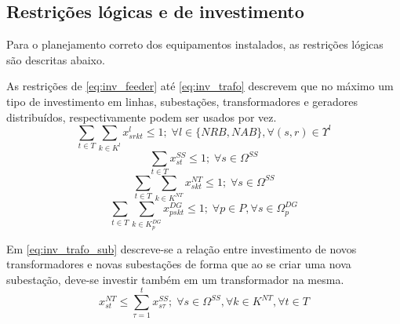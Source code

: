 \subsection{Restrições lógicas e de investimento}

Para o planejamento correto dos equipamentos instalados, as restrições lógicas são descritas abaixo.

As restrições de \eqref{eq:inv_feeder} até \eqref{eq:inv_trafo} descrevem que no máximo um tipo de investimento em linhas, subestações, transformadores e geradores distribuídos, respectivamente podem ser usados por vez.
\begin{equation}
    \sum_{t \in T} \sum_{k \in K^l} x^l_{srkt} \leq 1; \; \forall l \in \{NRB, NAB\}, \forall (s,r) \in \Upsilon^l
    \label{eq:inv_feeder}
\end{equation}
\begin{equation}
    \sum_{t \in T} x^{SS}_{st} \leq 1; \; \forall s \in \Omega^{SS}
    \label{eq:inv_sub}
\end{equation}
\begin{equation}
    \sum_{t \in T} \sum_{k \in K^{NT}} x^{NT}_{skt} \leq 1; \; \forall s \in \Omega^{SS}
    \label{eq:inv_trafo}
\end{equation}
\begin{equation}
    \sum_{t \in T} \sum_{k \in K^{DG}_p} x^{DG}_{pskt} \leq 1; \; \forall p \in P, \forall s \in \Omega^{DG}_p
    \label{eq:inv_DG}
\end{equation}

Em \eqref{eq:inv_trafo_sub} descreve-se a relação entre investimento de novos transformadores e novas subestações de forma que ao se criar uma nova subestação, deve-se investir também em um transformador na mesma.
\begin{equation}
    x^{NT}_{st} \leq \sum_{\tau =1}^t x^{SS}_{s\tau}; \; \forall s \in \Omega^{SS}, \forall k \in K^{NT}, \forall t \in T
    \label{eq:inv_trafo_sub}
\end{equation}

